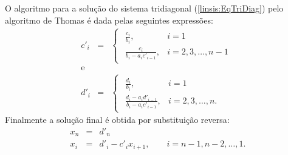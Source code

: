 O algoritmo para a solução do sistema tridiagonal (\ref{linsis:EqTriDiag}) pelo algoritmo de Thomas é dada pelas seguintes expressões:
\begin{eqnarray}\label{linsis:TriDiag_1}
 c'_i &=&
\begin{cases}
\begin{array}{lcl}
  \frac{c_i}{b_i}                   , & i = 1 \\
  \frac{c_i}{b_i - a_i c'_{i - 1}}  , & i = 2, 3, \dots, n-1 
\end{array}
\end{cases}\\
\text{e}\nonumber\\
d'_i &=&
\begin{cases}
\begin{array}{lcl}
  \frac{d_i}{b_i}                   , & i = 1 \\
  \frac{d_i - a_i d'_{i - 1}}{b_i - a_i c'_{i - 1}}  , & i = 2, 3, \dots, n. 
\end{array}
\end{cases}
\end{eqnarray}
Finalmente a solução final é obtida por substituição reversa:
\begin{eqnarray}\label{linsis:TriDiag_2}
x_n &=& d'_n\\
 x_i &=& d'_i - c'_i x_{i + 1}, \qquad   i = n - 1, n - 2, \ldots, 1.
\end{eqnarray}

